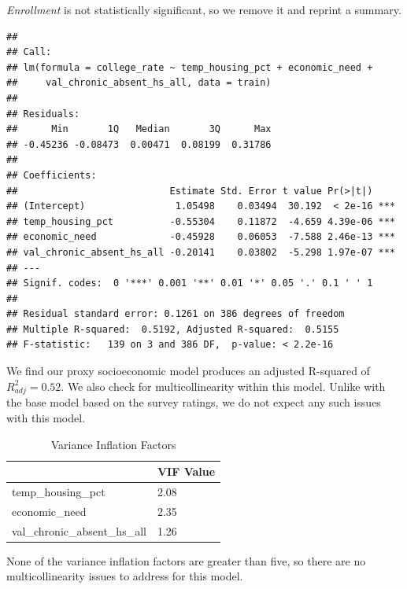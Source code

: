 \documentclass[
  man,floatsintext]{apa6}
\begin{document}
\emph{Enrollment} is not statistically significant, so we remove it and reprint a summary.

\begin{verbatim}
## 
## Call:
## lm(formula = college_rate ~ temp_housing_pct + economic_need + 
##     val_chronic_absent_hs_all, data = train)
## 
## Residuals:
##      Min       1Q   Median       3Q      Max 
## -0.45236 -0.08473  0.00471  0.08199  0.31786 
## 
## Coefficients:
##                           Estimate Std. Error t value Pr(>|t|)    
## (Intercept)                1.05498    0.03494  30.192  < 2e-16 ***
## temp_housing_pct          -0.55304    0.11872  -4.659 4.39e-06 ***
## economic_need             -0.45928    0.06053  -7.588 2.46e-13 ***
## val_chronic_absent_hs_all -0.20141    0.03802  -5.298 1.97e-07 ***
## ---
## Signif. codes:  0 '***' 0.001 '**' 0.01 '*' 0.05 '.' 0.1 ' ' 1
## 
## Residual standard error: 0.1261 on 386 degrees of freedom
## Multiple R-squared:  0.5192, Adjusted R-squared:  0.5155 
## F-statistic:   139 on 3 and 386 DF,  p-value: < 2.2e-16
\end{verbatim}

We find our proxy socioeconomic model produces an adjusted R-squared of \(R^2_{adj} = 0.52\). We also check for multicollinearity within this model. Unlike with the base model based on the survey ratings, we do not expect any such issues with this model.

\begin{table}[H]

\begin{center}
\begin{threeparttable}

\caption{\label{tab:proxy-model-vif-check}Variance Inflation Factors}

\begin{tabular}{ll}
\toprule
 & \multicolumn{1}{c}{VIF Value}\\
\midrule
temp\_housing\_pct & 2.08\\
economic\_need & 2.35\\
val\_chronic\_absent\_hs\_all & 1.26\\
\bottomrule
\end{tabular}

\end{threeparttable}
\end{center}

\end{table}

None of the variance inflation factors are greater than five, so there are no multicollinearity issues to address for this model.
\end{document}
